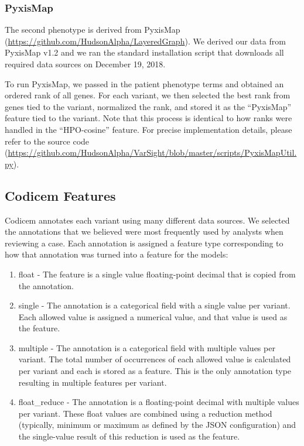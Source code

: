 \documentclass{article}
\begin{document}
\subsubsection{PyxisMap}
The second phenotype is derived from PyxisMap (\url{https://github.com/HudsonAlpha/LayeredGraph}).  We derived our data from PyxisMap v1.2 and we ran the standard installation script that downloads all required data sources on December 19, 2018.

To run PyxisMap, we passed in the patient phenotype terms and obtained an ordered rank of all genes.  For each variant, we then selected the best rank from genes tied to the variant, normalized the rank, and stored it as the ``PyxisMap'' feature tied to the variant.  Note that this process is identical to how ranks were handled in the ``HPO-cosine'' feature.  For precise implementation details, please refer to the source code (\url{https://github.com/HudsonAlpha/VarSight/blob/master/scripts/PyxisMapUtil.py}).

\subsection{Codicem Features}
Codicem annotates each variant using many different data sources.  We selected the annotations that we believed were most frequently used by analysts when reviewing a case.  Each annotation is assigned a feature type corresponding to how that annotation was turned into a feature for the models:

\begin{enumerate}
\item float - The feature is a single value floating-point decimal that is copied from the annotation.
\item single - The annotation is a categorical field with a single value per variant.  Each allowed value is assigned a numerical value, and that value is used as the feature.
\item multiple - The annotation is a categorical field with multiple values per variant.  The total number of occurrences of each allowed value is calculated per variant and each is stored as a feature.  This is the only annotation type resulting in multiple features per variant.
\item float\_reduce - The annotation is a floating-point decimal with multiple values per variant.  These float values are combined using a reduction method (typically, minimum or maximum as defined by the JSON configuration) and the single-value result of this reduction is used as the feature.  
\end{enumerate}
\end{document}
